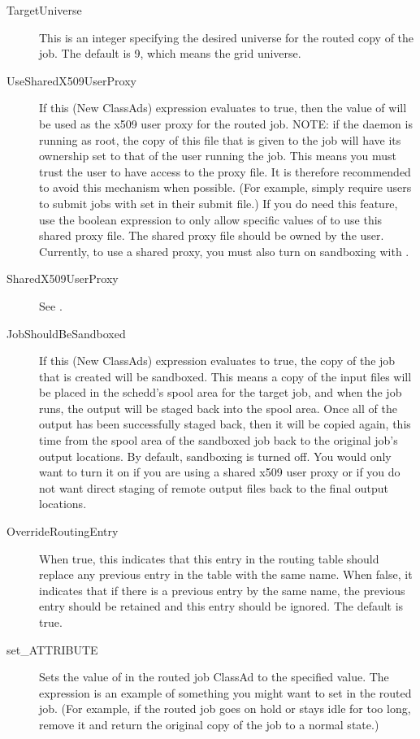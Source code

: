 \begin{description}
\item[TargetUniverse] This is an integer specifying the desired
universe for the routed copy of the job.  The default is 9, which
means the grid universe.

\item[UseSharedX509UserProxy] If this (New ClassAds) expression
evaluates to true, then the value of  will
be used as the x509 user proxy for the routed job.  NOTE: if the  daemon
is running as root, the copy of this file that is given to the job
will have its ownership set to that of the user running the job.  This
means you must trust the user to have access to the proxy file.  It is
therefore recommended to avoid this mechanism when possible.  (For
example, simply require users to submit jobs with 
set in their submit file.)  If you do need this feature, use the
boolean expression to only allow specific values of 
to use this shared proxy file.  The shared proxy file should be owned
by the  user.  Currently, to use a shared proxy, you must also
turn on sandboxing with .

\item[SharedX509UserProxy] See .

\item[JobShouldBeSandboxed] If this (New ClassAds) expression
evaluates to true, the copy of the job that is created will be
sandboxed.  This means a copy of the input files will be placed in the
schedd's spool area for the target job, and when the job runs, the
output will be staged back into the spool area.  Once all of the
output has been successfully staged back, then it will be copied
again, this time from the spool area of the sandboxed job back to the
original job's output locations.  By default, sandboxing is turned
off.  You would only want to turn it on if you are using a shared x509
user proxy or if you do not want direct staging of remote output files
back to the final output locations.

\item[OverrideRoutingEntry] When true, this indicates that this entry
in the routing table should replace any previous entry in the table
with the same name.  When false, it indicates that if there is a
previous entry by the same name, the previous entry should be retained
and this entry should be ignored.  The default is true.

\item[set\_ATTRIBUTE] Sets the value of  in the routed
job ClassAd to the specified value.  The 
expression is an example of something you might want to set in the
routed job.  (For example, if the routed job goes on hold or stays
idle for too long, remove it and return the original copy of the job to
a normal state.)


\end{description}
